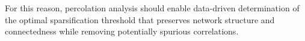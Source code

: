 For this reason, percolation analysis should enable data-driven determination of the optimal sparsification threshold that preserves network structure and connectedness while removing potentially spurious correlations.







